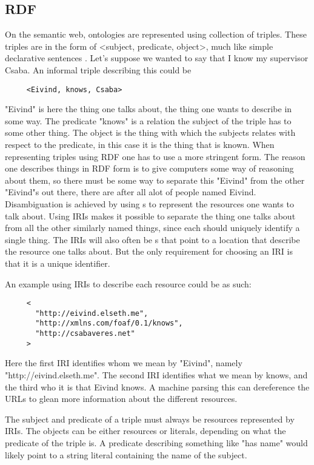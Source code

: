 \subsection{RDF}
On the semantic web, ontologies are represented using collection of  triples.
These triples are in the form of <subject, predicate, object>, much like simple declarative sentences \citep{Berners-Lee2001}.
Let's suppose we wanted to say that I know my supervisor Csaba.
An informal triple describing this could be
\begin{verbatim}
     <Eivind, knows, Csaba>
\end{verbatim}
"Eivind" is here the thing one talks about, the thing one wants to describe in some way.
The predicate "knows" is a relation the subject of the triple has to some other thing.
The object is the thing with which the subjects relates with respect to the predicate, in this case it is the thing that is known.
When representing triples using RDF one has to use a more stringent form.
The reason one describes things in RDF form is to give computers some way of reasoning about them,
so there must be some way to separate this "Eivind" from the other "Eivind"s out there,
there are after all alot of people named Eivind.
Disambiguation is achieved by using s to represent the resources one wants to talk about.
Using IRIs makes it possible to separate the thing one talks about from all the other similarly named things,
since each should uniquely identify a single thing.
The IRIs will also often be s
that point to a location that describe the resource one talks about.
But the only requirement for choosing an IRI is that it is a unique identifier.

An example using IRIs to describe each resource could be as such:
\begin{verbatim}
     <
       "http://eivind.elseth.me",
       "http://xmlns.com/foaf/0.1/knows",
       "http://csabaveres.net"
     >
\end{verbatim}
Here the first IRI identifies whom we mean by "Eivind", namely "http://eivind.elseth.me".
The second IRI identifies what we mean by knows, and the third who it is that Eivind knows.
A machine parsing this can dereference the URLs to glean more information about the different resources.

The subject and predicate of a triple must always be resources represented by IRIs.
The objects can be either resources or literals, depending on what the predicate of the triple is.
A predicate describing something like "has name" would likely point to a string literal containing the name of the subject\citep{Hebeler2009Chp3}.

